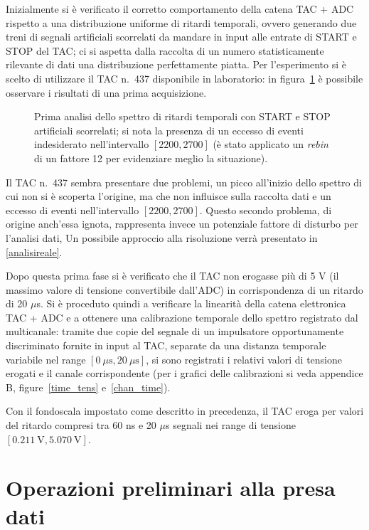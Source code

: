 \documentclass[10pt, oneside, a4paper]{article}   	%
\begin{document}
Inizialmente si è verificato il corretto comportamento della catena TAC + ADC rispetto a una distribuzione uniforme di ritardi temporali, ovvero generando due treni di segnali artificiali scorrelati da mandare in input alle entrate di START e STOP del TAC; ci si aspetta dalla raccolta di un numero statisticamente rilevante di dati una distribuzione perfettamente piatta. Per l'esperimento si è scelto di utilizzare il TAC n.~437 disponibile in laboratorio: in figura~\ref{rumore1} è possibile osservare i risultati di una prima acquisizione.
%
\begin{figure}[h]
  \centering  
  
  \caption{Prima analisi dello spettro di ritardi temporali con START e STOP artificiali scorrelati; si nota la presenza di un eccesso di eventi indesiderato nell'intervallo $[2200,2700]$ (è stato applicato un \emph{rebin} di un fattore 12 per evidenziare meglio la situazione).}
  \label{rumore1}
\end{figure}
%

Il TAC n.~437 sembra presentare due problemi, un picco all'inizio dello spettro di cui non si è scoperta l'origine, ma che non influisce sulla raccolta dati e un eccesso di eventi nell'intervallo $[2200,2700]$. Questo secondo problema, di origine anch'essa ignota, rappresenta invece un potenziale fattore di disturbo per l'analisi dati, Un possibile approccio alla risoluzione verrà presentato in \cref{analisireale}.

Dopo questa prima fase si è verificato che il TAC  non erogasse più di 5 V (il massimo valore di tensione convertibile dall'ADC) in corrispondenza di un ritardo di 20 $\mu$s. Si è proceduto quindi a verificare la linearità della catena elettronica TAC + ADC e a ottenere una calibrazione temporale dello spettro registrato dal multicanale: tramite due copie del segnale di un impulsatore opportunamente discriminato fornite in input al TAC, separate da una distanza temporale variabile nel range $[0 \ \mu \mbox{s},20 \ \mu \mbox{s}]$, si sono registrati i relativi valori di tensione erogati e il canale corrispondente (per i grafici delle calibrazioni si veda appendice B, figure~\ref{time_tens} e~\ref{chan_time}).

Con il fondoscala impostato come descritto in precedenza, il TAC eroga per valori del ritardo compresi tra 60 ns e 20 $\mu$s segnali nei range di tensione $[0.211 \ \mbox{V}, 5.070 \ \mbox{V}]$.
%
%
\section{Operazioni preliminari alla presa dati}
\end{document}
